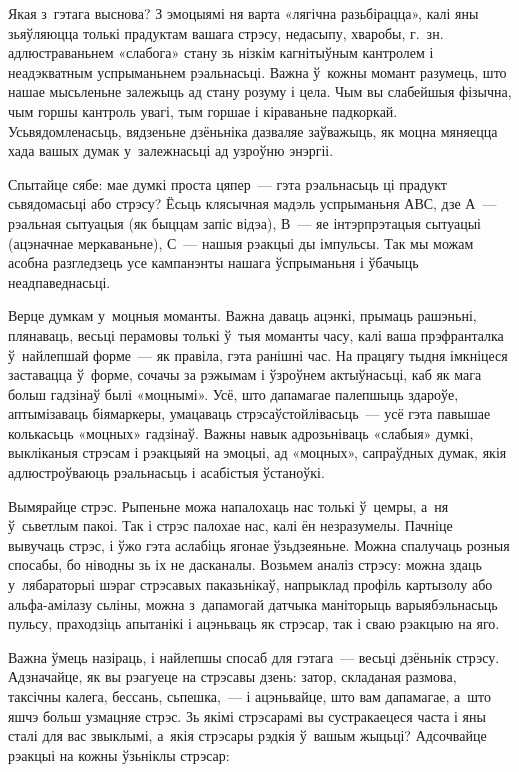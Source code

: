 Якая з~гэтага выснова? З эмоцыямі ня варта «лягічна разьбірацца», калі яны зьяўляюцца толькі прадуктам вашага стрэсу, недасыпу, хваробы, г.~зн. адлюстраваньнем «слабога» стану зь нізкім кагнітыўным кантролем і неадэкватным успрыманьнем рэальнасьці. Важна ў~кожны момант разумець, што нашае мысьленьне залежыць ад стану розуму і цела. Чым вы слабейшыя фізычна, чым горшы кантроль увагі, тым горшае і кіраваньне падкоркай. Усьвядомленасьць, вядзеньне дзёньніка дазваляе заўважыць, як моцна мяняецца хада вашых думак у~залежнасьці ад узроўню энэргіі.

Спытайце сябе: мае думкі проста цяпер~--- гэта рэальнасьць ці прадукт сьвядомасьці або стрэсу? Ёсьць клясычная мадэль успрыманьня АВС, дзе А~--- рэальная сытуацыя (як быццам запіс відэа), В~--- яе інтэрпрэтацыя сытуацыі (ацэначнае меркаваньне), С~--- нашыя рэакцыі ды імпульсы. Так мы можам асобна разгледзець усе кампанэнты нашага ўспрыманьня і ўбачыць неадпаведнасьці. 

Верце думкам у~моцныя моманты. Важна даваць ацэнкі, прымаць рашэньні, плянаваць, весьці перамовы толькі ў~тыя моманты часу, калі ваша прэфранталка ў~найлепшай форме~--- як правіла, гэта ранішні час. На працягу тыдня імкніцеся заставацца ў~форме, сочачы за рэжымам і ўзроўнем актыўнасьці, каб як мага больш гадзінаў былі «моцнымі». Усё, што дапамагае палепшыць здароўе, аптымізаваць біямаркеры, умацаваць стрэсаўстойлівасьць~--- усё гэта павышае колькасьць «моцных» гадзінаў. Важны навык адрозьніваць «слабыя» думкі, выкліканыя стрэсам і рэакцыяй на эмоцыі, ад «моцных», сапраўдных думак, якія адлюстроўваюць рэальнасьць і асабістыя ўстаноўкі.

Вымярайце стрэс. Рыпеньне можа напалохаць нас толькі ў~цемры, а~ня ў~сьветлым пакоі. Так і стрэс палохае нас, калі ён незразумелы. Пачніце вывучаць стрэс, і ўжо гэта аслабіць ягонае ўзьдзеяньне. Можна спалучаць розныя спосабы, бо ніводны зь іх не дасканалы. Возьмем аналіз стрэсу: можна здаць у~лябараторыі шэраг стрэсавых паказьнікаў, напрыклад профіль картызолу або альфа-амілазу сьліны, можна з~дапамогай датчыка маніторыць варыябэльнасьць пульсу, праходзіць апытанікі і ацэньваць як стрэсар, так і сваю рэакцыю на яго.

Важна ўмець назіраць, і найлепшы спосаб для гэтага~--- весьці дзёньнік стрэсу. Адзначайце, як вы рэагуеце на стрэсавы дзень: затор, складаная размова, таксічны калега, бессань, сьпешка,~--- і ацэньвайце, што вам дапамагае, а~што яшчэ больш узмацняе стрэс. Зь якімі стрэсарамі вы сустракаецеся часта і яны сталі для вас звыклымі, а~якія стрэсары рэдкія ў~вашым жыцьці? Адсочвайце рэакцыі на кожны ўзьніклы стрэсар: 

